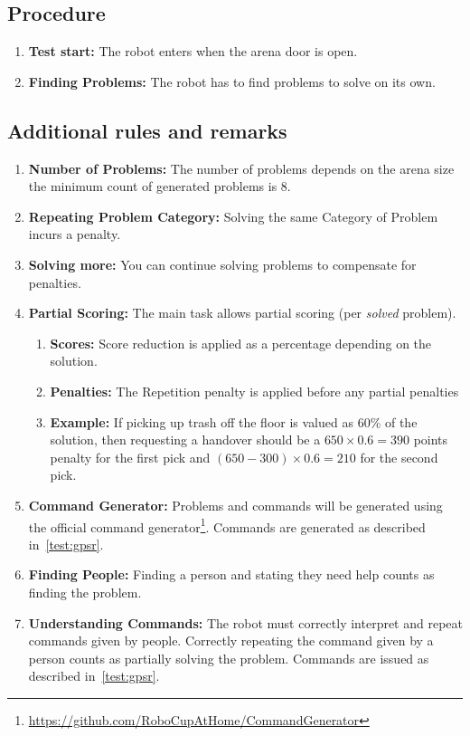 \subsection*{Procedure}
\begin{enumerate}[nosep]
	\item \textbf{Test start:} The robot enters when the arena door is open.
	\item \textbf{Finding Problems:} The robot has to find problems to solve on its own.
\end{enumerate}

\subsection*{Additional rules and remarks}
\begin{enumerate}[nosep]
	\item \textbf{Number of Problems:} The number of problems depends on the arena size the minimum count of generated problems is 8.
	\item \textbf{Repeating Problem Category:} Solving the same Category of Problem incurs a penalty. 
	\item \textbf{Solving more:} You can continue solving problems to compensate for penalties.
	\item \textbf{Partial Scoring:} The main task allows partial scoring (per \emph{solved} problem).
	\begin{enumerate}[nosep]
		\item \textbf{Scores:} Score reduction is applied as a percentage depending on the solution.
		\item \textbf{Penalties:} The Repetition penalty is applied before any partial penalties
		\item \textbf{Example:} If picking up trash off the floor is valued as 60\% of the solution, then requesting a handover should be a $ 650 \times 0.6 = 390 $ points penalty for the first pick and  $ \left( 650 - 300 \right) \times 0.6 = 210 $ for the second pick.
	\end{enumerate}
	\item \textbf{Command Generator:} Problems and commands will be generated using the official command generator\footnote{\url{https://github.com/RoboCupAtHome/CommandGenerator}}. Commands are generated as described in~\ref{test:gpsr}.
	\item \textbf{Finding People:} Finding a person and stating they need help counts as finding the problem.
	\item \textbf{Understanding Commands:} The robot must correctly interpret and repeat commands given by people. Correctly repeating the command given by a person counts as partially solving the problem. Commands are issued as described in~\ref{test:gpsr}.
\end{enumerate}


